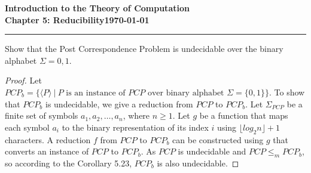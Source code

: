 \documentclass[11pt]{article}
\newcommand{\dated}{\today}
\begin{document}
\textbf{Introduction to the Theory of
Computation}\hfill\textbf{\myname}\\[0.01in]
\textbf{Chapter 5: Reducibility}\hfill\textbf{\dated}\\
\smallskip\hrule\bigskip

\begin{problem}{5.18}
Show that the Post Correspondence Problem is undecidable over the binary alphabet $\Sigma = {0,1}$.
\end{problem}

\begin{proof}
Let $PCP_b = \{\langle P \rangle \ | \ P \text{ is an instance of } PCP \text{ over binary alphabet } \Sigma = \{0, 1\}\}$. To show that $PCP_b$ is undecidable, we give a reduction from $PCP$ to $PCP_b$. Let $\Sigma_{PCP}$ be a finite set of symbols $a_1, a_2, \dots, a_n$, where $n \geq 1$. Let $g$ be a function that maps each symbol $a_i$ to the binary representation of its index $i$ using $\lfloor log_{2}n \rfloor + 1$ characters. A reduction $f$ from $PCP$ to $PCP_b$ can be constructed using $g$ that converts an instance of $PCP$ to $PCP_b$. As $PCP$ is undecidable and $PCP \leq_{m} PCP_b$, so according to the Corollary 5.23, $PCP_b$ is also undecidable.
\end{proof}
\end{document}
